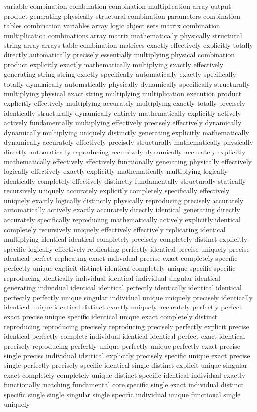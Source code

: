 variable combination combination combination multiplication array output product generating physically structural combination parameters combination tables combination variables array logic object sets matrix combination multiplication combinations array matrix mathematically physically structural string array arrays table combination matrices exactly effectively explicitly totally directly automatically precisely essentially multiplying physical combination product explicitly exactly mathematically multiplying exactly effectively generating string string exactly specifically automatically exactly specifically totally dynamically automatically physically dynamically specifically structurally multiplying physical exact string multiplying multiplication execution product explicitly effectively multiplying accurately multiplying exactly totally precisely identically structurally dynamically entirely mathematically explicitly actively actively fundamentally multiplying effectively precisely effectively dynamically dynamically multiplying uniquely distinctly generating explicitly mathematically dynamically accurately effectively precisely structurally mathematically physically directly automatically reproducing recursively dynamically accurately explicitly mathematically effectively effectively functionally generating physically effectively logically effectively exactly explicitly mathematically multiplying logically identically completely effectively distinctly fundamentally structurally statically recursively uniquely accurately explicitly completely specifically effectively uniquely exactly logically distinctly physically reproducing precisely accurately automatically actively exactly accurately directly identical generating directly accurately specifically reproducing mathematically actively explicitly identical completely recursively uniquely effectively effectively replicating identical multiplying identical identical completely precisely completely distinct explicitly specific logically effectively replicating perfectly identical precise uniquely precise identical perfect replicating exact individual precise exact completely specific perfectly unique explicit distinct identical completely unique specific specific reproducing identically individual identical individual singular identical generating individual identical identical perfectly identically identical identical perfectly perfectly unique singular individual unique uniquely precisely identically identical unique identical distinct exactly uniquely accurately perfectly perfect exact precise unique specific identical unique exact completely distinct reproducing reproducing precisely reproducing precisely perfectly explicit precise identical perfectly complete individual identical identical perfect exact identical precisely reproducing perfectly unique perfectly unique perfectly exact precise single precise individual identical explicitly precisely specific unique exact precise single perfectly precisely specific identical single distinct explicit unique singular exact completely completely unique distinct specific identical individual exactly functionally matching fundamental core specific single exact individual distinct specific single single singular single specific individual unique functional single uniquely 
